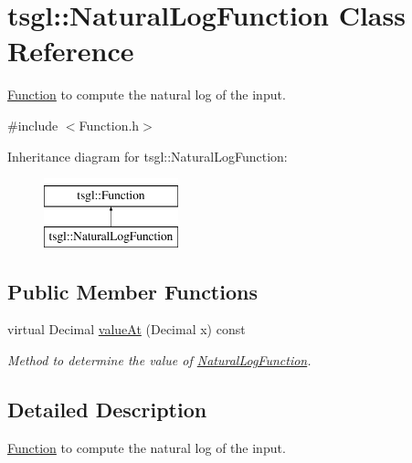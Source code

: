 \hypertarget{classtsgl_1_1_natural_log_function}{\section{tsgl\-:\-:\-Natural\-Log\-Function \-Class \-Reference}
\label{classtsgl_1_1_natural_log_function}
}


\hyperlink{classtsgl_1_1_function}{\-Function} to compute the natural log of the input.  




{\ttfamily \#include $<$\-Function.\-h$>$}

\-Inheritance diagram for tsgl\-:\-:\-Natural\-Log\-Function\-:\begin{figure}[H]
\begin{center}
\leavevmode
\includegraphics[height=2.000000cm]{classtsgl_1_1_natural_log_function}
\end{center}
\end{figure}
\subsection*{\-Public \-Member \-Functions}
\begin{DoxyCompactItemize}
\item 
virtual \-Decimal \hyperlink{classtsgl_1_1_natural_log_function_a21ce8c1cad8b13dccf9308c73a48df12}{value\-At} (\-Decimal x) const 
\begin{DoxyCompactList}\small\item\em \-Method to determine the value of \hyperlink{classtsgl_1_1_natural_log_function}{\-Natural\-Log\-Function}. \end{DoxyCompactList}\end{DoxyCompactItemize}


\subsection{\-Detailed \-Description}
\hyperlink{classtsgl_1_1_function}{\-Function} to compute the natural log of the input. 

